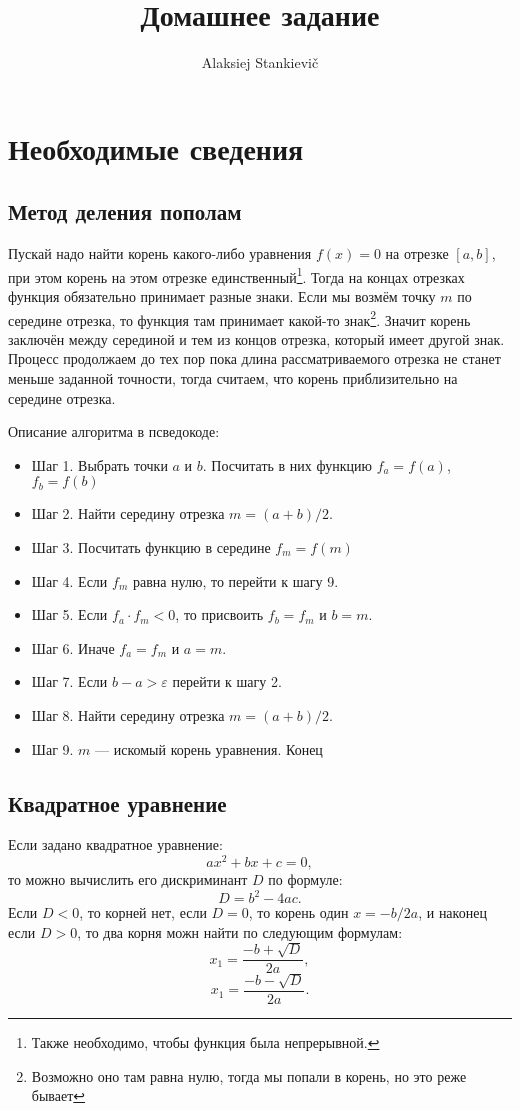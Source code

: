 \documentclass[12pt]{article}
\author{Alaksiej Stankievič}
\title{Домашнее задание}
\begin{document}

\section{Необходимые сведения}
\subsection{Метод деления пополам}
Пускай надо найти корень какого-либо уравнения $f(x)=0$ на отрезке $[a, b]$, при этом корень на этом отрезке единственный\footnote{Также необходимо, чтобы функция была непрерывной.}. Тогда на концах отрезках функция обязательно принимает разные знаки. Если мы возмём точку $m$ по середине отрезка, то функция там принимает какой-то знак\footnote{Возможно оно там равна нулю, тогда мы попали в корень, но это реже бывает}. Значит корень заключён между серединой и тем из концов отрезка, который имеет другой знак. Процесс продолжаем до тех пор пока длина рассматриваемого отрезка не станет меньше заданной точности, тогда считаем, что корень приблизительно на середине отрезка.

Описание алгоритма в псведокоде:
\begin{itemize}
 \item Шаг 1. Выбрать точки $a$ и $b$. Посчитать в них функцию $f_a=f(a)$, $f_b=f(b)$
 \item Шаг 2. Найти середину отрезка $m=(a+b)/2$.
 \item Шаг 3. Посчитать функцию в середине $f_m=f(m)$
 \item Шаг 4. Если $f_m$ равна нулю, то перейти к шагу 9.
 \item Шаг 5. Если $f_a\cdot{}f_m<0$, то присвоить $f_b=f_m$ и $b=m$. 
 \item Шаг 6. Иначе $f_a=f_m$ и $a=m$.
 \item Шаг 7. Если $b-a>\varepsilon$ перейти к шагу 2.
 \item Шаг 8. Найти середину отрезка $m=(a+b)/2$.
 \item Шаг 9. $m$ --- искомый корень уравнения. Конец
\end{itemize}

\subsection{Квадратное уравнение}
Если задано квадратное уравнение:
\begin{equation}
 ax^2+bx+c=0,
\end{equation}
то можно вычислить его дискриминант $D$ по формуле:
\begin{equation}
 D=b^2-4ac.
\end{equation}
Если $D<0$, то корней нет, если $D=0$, то корень один $x=-b/2a$, и наконец если $D>0$, то два корня можн найти по следующим формулам:
\begin{equation}
 x_1=\frac{-b+\sqrt{D}}{2a},
\end{equation}
\begin{equation}
 x_1=\frac{-b-\sqrt{D}}{2a}.
\end{equation}
\end{document}
